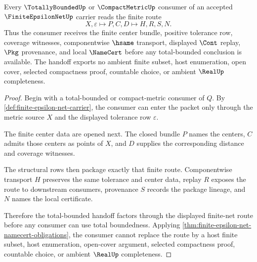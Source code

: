 \begin{theorem}
\label{thm:finite-epsilon-net-totally-bounded-handoff}
Every $\TotallyBoundedUp$ or $\CompactMetricUp$ consumer of an accepted $\FiniteEpsilonNetUp$ carrier reads the finite route
$$
X,\varepsilon \longmapsto P,C,D \longmapsto H,R,S,N .
$$
Thus the consumer receives the finite center bundle, positive tolerance row, coverage witnesses, componentwise $\hsame$ transport, displayed $\Cont$ replay, $\Pkg$ provenance, and local $\NameCert$ before any total-bounded conclusion is available. The handoff exports no ambient finite subset, host enumeration, open cover, selected compactness proof, countable choice, or ambient $\RealUp$ completeness.
\end{theorem}
\begin{proof}
Begin with a total-bounded or compact-metric consumer of $Q$. By \autoref{def:finite-epsilon-net-carrier}, the consumer can enter the packet only through the metric source $X$ and the displayed tolerance row $\varepsilon$.

The finite center data are opened next. The closed bundle $P$ names the centers, $C$ admits those centers as points of $X$, and $D$ supplies the corresponding distance and coverage witnesses.

The structural rows then package exactly that finite route. Componentwise transport $H$ preserves the same tolerance and center data, replay $R$ exposes the route to downstream consumers, provenance $S$ records the package lineage, and $N$ names the local certificate.

Therefore the total-bounded handoff factors through the displayed finite-net route before any consumer can use total boundedness. Applying \autoref{thm:finite-epsilon-net-namecert-obligations}, the consumer cannot replace the route by a host finite subset, host enumeration, open-cover argument, selected compactness proof, countable choice, or ambient $\RealUp$ completeness.
\end{proof}

